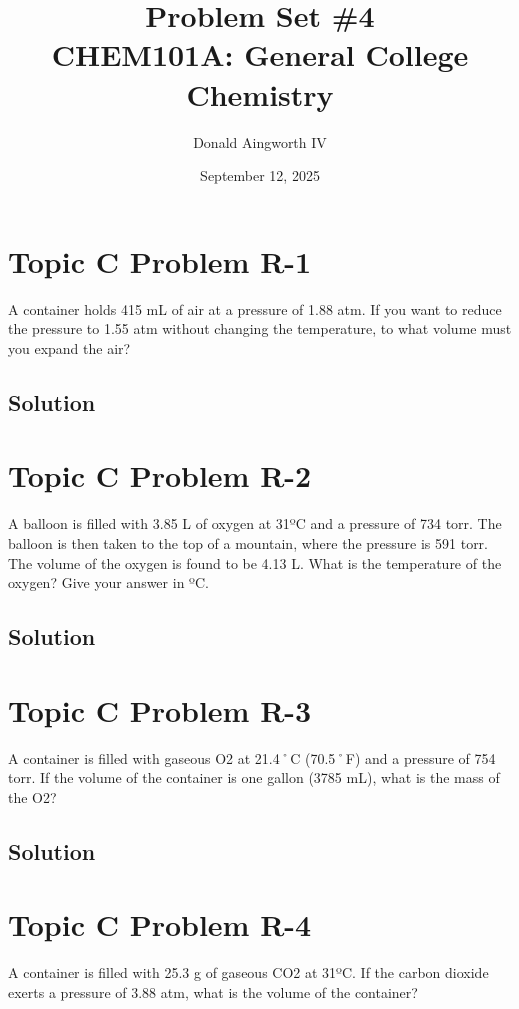 \documentclass[10pt]{article}
\title{
    Problem Set \#4
    \\  \small
    CHEM101A: General College Chemistry
    }
\author{Donald Aingworth IV}
\date{September 12, 2025}
\begin{document}

    \maketitle

    \pagebreak
    \section{Topic C Problem R-1}
        A container holds 415 mL of air at a pressure of 1.88 atm. 
        If you want to reduce the pressure to 1.55 atm without changing the temperature, to what volume must you expand the air?

        \subsection{Solution}

    \pagebreak
    \section{Topic C Problem R-2}
        A balloon is filled with 3.85 L of oxygen at 31ºC and a pressure of 734 torr. 
        The balloon is then taken to the top of a mountain, where the pressure is 591 torr. 
        The volume of the oxygen is found to be 4.13 L. What is the temperature of the oxygen? 
        Give your answer in ºC.

        \subsection{Solution}

    \pagebreak
    \section{Topic C Problem R-3}
        A container is filled with gaseous O2 at 21.4˚C (70.5˚F) and a pressure of 754 torr. 
        If the volume of the container is one gallon (3785 mL), what is the mass of the O2?

        \subsection{Solution}

    \pagebreak
    \section{Topic C Problem R-4}
        A container is filled with 25.3 g of gaseous CO2 at 31ºC. 
        If the carbon dioxide exerts a pressure of 3.88 atm, what is the volume of the container?
\end{document}
